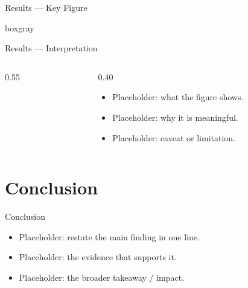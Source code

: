 \begin{frame}{Results --- Key Figure}
  \begin{beamercolorbox}[wd=0.95\textwidth,rounded=true,sep=0.5em]{boxgray}
    \centering{}
  \end{beamercolorbox}
\end{frame}

\begin{frame}{Results --- Interpretation}
  \begin{columns}[c]
    \begin{column}{0.55\textwidth}\centering
    \end{column}
    \begin{column}{0.40\textwidth}
      \begin{itemize}\setlength{\itemsep}{1.0em}
        \item Placeholder: what the figure shows.
        \item Placeholder: why it is meaningful.
        \item Placeholder: caveat or limitation.
      \end{itemize}
    \end{column}
  \end{columns}
\end{frame}

\section{Conclusion}

\begin{frame}{Conclusion}
  \begin{itemize}\setlength{\itemsep}{0.9em}
    \item Placeholder: restate the main finding in one line.
    \item Placeholder: the evidence that supports it.
    \item Placeholder: the broader takeaway / impact.
  \end{itemize}
\end{frame}

